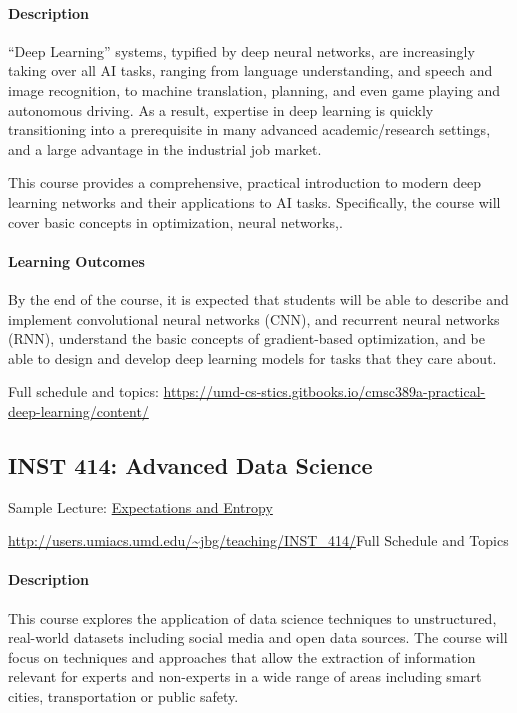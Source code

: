 \documentclass{article}
\begin{document}
\paragraph{Description}
``Deep Learning'' systems, typified by deep neural networks, are increasingly taking over all AI tasks, ranging from language understanding, and speech and image recognition, to machine translation, planning, and even game playing and autonomous driving. As a result, expertise in deep learning is quickly transitioning into a prerequisite in many advanced academic/research settings, and a large advantage in the industrial job market.

This course provides a comprehensive, practical introduction to modern deep learning networks and their applications to AI tasks. Specifically, the course will cover basic concepts in optimization, neural networks,.

\paragraph{Learning Outcomes} By the end of the course, it is expected that students will be able to describe and implement convolutional neural networks (CNN), and recurrent neural networks (RNN), understand the basic concepts of gradient-based optimization, and be able to design and develop deep learning models for tasks that they care about.

Full schedule and topics: \url{https://umd-cs-stics.gitbooks.io/cmsc389a-practical-deep-learning/content/}

\subsection{INST 414: Advanced Data Science}

\begin{itemize*}
\item Sample Lecture: \href{https://www.youtube.com/watch?v=O28U08_yaGU}{Expectations and Entropy}
\item \url{http://users.umiacs.umd.edu/~jbg/teaching/INST_414/}{Full Schedule and Topics}
\end{itemize*}

\paragraph{Description}
This course explores the application of data science techniques to unstructured, real-world datasets including social media and open data sources. The course will focus on techniques and approaches that allow the extraction of information relevant for experts and non-experts in a wide range of areas including smart cities, transportation or public safety.
\end{document}
